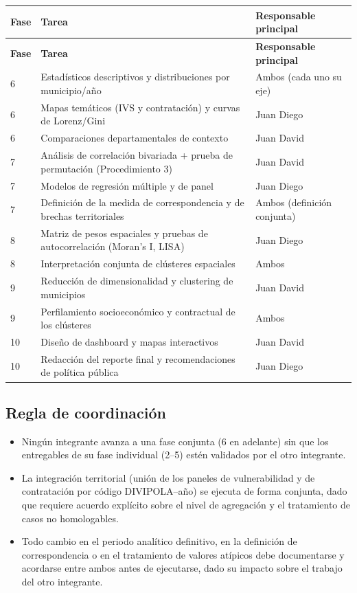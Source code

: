 \documentclass[11pt,letterpaper]{article}
\begin{document}
\begin{center}
\small
\begin{longtable}{p{1.6cm}p{6.3cm}p{4.5cm}}
\toprule
\textbf{Fase} & \textbf{Tarea} & \textbf{Responsable principal} \\
\midrule
\endfirsthead
\toprule
\textbf{Fase} & \textbf{Tarea} & \textbf{Responsable principal} \\
\midrule
\endhead
6 & Estadísticos descriptivos y distribuciones por municipio/año & Ambos (cada uno su eje) \\
6 & Mapas temáticos (IVS y contratación) y curvas de Lorenz/Gini & Juan Diego \\
6 & Comparaciones departamentales de contexto & Juan David \\
7 & Análisis de correlación bivariada + prueba de permutación (Procedimiento 3) & Juan David \\
7 & Modelos de regresión múltiple y de panel & Juan Diego \\
7 & Definición de la medida de correspondencia y de brechas territoriales & Ambos (definición conjunta) \\
8 & Matriz de pesos espaciales y pruebas de autocorrelación (Moran's I, LISA) & Juan Diego \\
8 & Interpretación conjunta de clústeres espaciales & Ambos \\
9 & Reducción de dimensionalidad y clustering de municipios & Juan David \\
9 & Perfilamiento socioeconómico y contractual de los clústeres & Ambos \\
10 & Diseño de dashboard y mapas interactivos & Juan David \\
10 & Redacción del reporte final y recomendaciones de política pública & Juan Diego \\
\bottomrule
\end{longtable}
\end{center}

\subsection{Regla de coordinación}

\begin{itemize}
\item Ningún integrante avanza a una fase conjunta (6 en adelante) sin que los
entregables de su fase individual (2--5) estén validados por el otro
integrante.
\item La integración territorial (unión de los paneles de vulnerabilidad y de
contratación por código DIVIPOLA--año) se ejecuta de forma conjunta, dado que
requiere acuerdo explícito sobre el nivel de agregación y el tratamiento de
casos no homologables.
\item Todo cambio en el periodo analítico definitivo, en la definición de
correspondencia o en el tratamiento de valores atípicos debe documentarse y
acordarse entre ambos antes de ejecutarse, dado su impacto sobre el trabajo del
otro integrante.
\end{itemize}
\end{document}
